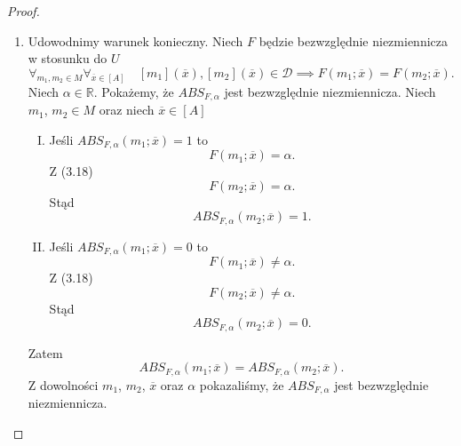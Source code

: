 \documentclass[12pt,a4paper]{report}
\newcommand{\domkniecie}[1]{\left[ {#1} \right] }
\begin{document}
\begin{proof}
\begin{enumerate}
\item
Udowodnimy warunek konieczny.
Niech $F$ będzie bezwzględnie niezmiennicza w stosunku do $U$ 
\begin{equation}
\forall_{m_{1}, m_{2} \in M}  \forall_{\overline{x} \in \domkniecie{A}} \quad \domkniecie{m_1}(\overline{x}), \domkniecie{m_2}(\overline{x})\in \mathcal{D} \implies F(m_{1};\overline{x})=F(m_{2};\overline{x}).
\end{equation}
Niech $\alpha \in \mathbb{R}$. Pokażemy, że $ABS_{F,\alpha}$ jest bezwzględnie niezmiennicza. Niech $m_1$, $m_2 \in M$ oraz niech $\overline{x} \in \domkniecie{A}$ 
\begin{enumerate}[I.]
\item
Jeśli $ABS_{F,\alpha}(m_1;\overline{x})=1$ to 
$$
F(m_1;\overline{x})=\alpha.
$$ 
Z (3.18) 
$$
F(m_2;\overline{x})=\alpha.
$$
Stąd 
$$
ABS_{F,\alpha}(m_2;\overline{x})=1.
$$
\item
Jeśli $ABS_{F,\alpha}(m_1;\overline{x})=0$ to 
$$
F(m_1;\overline{x})\ne \alpha.
$$
Z (3.18) 
$$
F(m_2;\overline{x})\ne\alpha.
$$
Stąd 
$$
ABS_{F,\alpha}(m_2;\overline{x})=0.
$$
\end{enumerate}
Zatem 
$$
ABS_{F,\alpha}(m_1;\overline{x})=ABS_{F,\alpha}(m_2;\overline{x}).
$$
Z dowolności $m_1$, $m_2$, $\overline{x}$ oraz $\alpha$ pokazaliśmy, że $ABS_{F,\alpha}$ jest bezwzględnie niezmiennicza.


\end{enumerate}
\end{proof}
\end{document}
